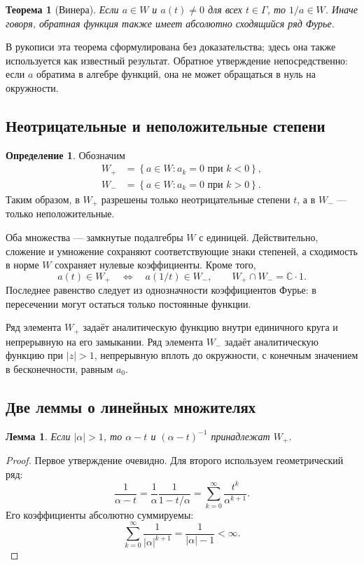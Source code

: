 \documentclass[12pt,a4paper]{article}
\newtheorem{theorem}{Теорема}
\newtheorem{lemma}{Лемма}
\theoremstyle{definition}
\newtheorem{definition}{Определение}
\theoremstyle{remark}
\newcommand{\CC}{\mathbb{C}}
\begin{document}
\begin{theorem}[Винера]
Если $a\in W$ и $a(t)\ne0$ для всех $t\in\Gamma$, то $1/a\in W$.
Иначе говоря, обратная функция также имеет абсолютно сходящийся
ряд Фурье.
\end{theorem}

В рукописи эта теорема сформулирована без доказательства; здесь она
также используется как известный результат. Обратное утверждение
непосредственно: если $a$ обратима в алгебре функций, она не может
обращаться в нуль на окружности.

\subsection{Неотрицательные и неположительные степени}

\begin{definition}
Обозначим
\begin{align*}
  W_+&=\left\{a\in W:a_k=0\text{ при }k<0\right\},\\
  W_-&=\left\{a\in W:a_k=0\text{ при }k>0\right\}.
\end{align*}
Таким образом, в $W_+$ разрешены только неотрицательные степени $t$,
а в $W_-$ --- только неположительные.
\end{definition}

Оба множества --- замкнутые подалгебры $W$ с единицей. Действительно,
сложение и умножение сохраняют соответствующие знаки степеней, а
сходимость в норме $W$ сохраняет нулевые коэффициенты. Кроме того,
\[
  a(t)\in W_+\quad\Longleftrightarrow\quad a(1/t)\in W_-,
  \qquad W_+\cap W_-=\CC\cdot1.
\]
Последнее равенство следует из однозначности коэффициентов Фурье:
в пересечении могут остаться только постоянные функции.

Ряд элемента $W_+$ задаёт аналитическую функцию внутри единичного
круга и непрерывную на его замыкании. Ряд элемента $W_-$ задаёт
аналитическую функцию при $|z|>1$, непрерывную вплоть до окружности,
с конечным значением в бесконечности, равным $a_0$.

\subsection{Две леммы о линейных множителях}

\begin{lemma}
Если $|\alpha|>1$, то $\alpha-t$ и $(\alpha-t)^{-1}$ принадлежат $W_+$.
\end{lemma}

\begin{proof}
Первое утверждение очевидно. Для второго используем геометрический ряд:
\[
  \frac1{\alpha-t}=\frac1\alpha\frac1{1-t/\alpha}
  =\sum_{k=0}^{\infty}\frac{t^k}{\alpha^{k+1}}.
\]
Его коэффициенты абсолютно суммируемы:
\[
  \sum_{k=0}^{\infty}\frac1{|\alpha|^{k+1}}
  =\frac1{|\alpha|-1}<\infty.
\]
\end{proof}
\end{document}

